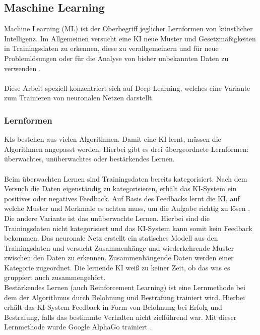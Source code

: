\documentclass[12pt,oneside,a4paper,parskip]{scrbook}
\begin{document}
\subsection{Maschine Learning}
Machine Learning (ML) ist der Oberbegriff jeglicher Lernformen von künstlicher Intelligenz. Im Allgemeinen versucht eine KI neue Muster und Gesetzmäßigkeiten in Trainingsdaten zu erkennen, diese zu verallgemeinern und für neue Problemlösungen oder für die Analyse von bisher unbekannten Daten zu verwenden \cite{EliminateHumanBias}.
\\\\Diese Arbeit speziell konzentriert sich auf Deep Learning, welches eine Variante zum Trainieren von neuronalen Netzen darstellt.
\subsubsection{Lernformen}
KIs bestehen aus vielen Algorithmen. Damit eine KI lernt, müssen die Algorithmen angepasst werden. Hierbei gibt es drei übergeordnete Lernformen: überwachtes, unüberwachtes oder bestärkendes Lernen. \\\\
Beim überwachten Lernen sind Trainingsdaten bereits kategorisiert. Nach dem Versuch die Daten eigenständig zu kategorisieren, erhält das KI-System ein positives oder negatives Feedback. Auf Basis des Feedbacks lernt die KI, auf welche Muster und Merkmale es achten muss, um die Aufgabe richtig zu lösen \cite{Grundlagen}. \\
Die andere Variante ist das unüberwachte Lernen. Hierbei sind die Trainingsdaten nicht kategorisiert und das KI-System kann somit kein Feedback bekommen. Das neuronale Netz erstellt ein statisches Modell aus den Trainingsdaten und versucht Zusammenhänge und wiederkehrende Muster zwischen den Daten zu erkennen. Zusammenhängende Daten werden einer Kategorie zugeordnet. Die lernende KI weiß zu keiner Zeit, ob das was es gruppiert auch zusammengehört.\\
Bestärkendes Lernen (auch Reinforcement Learning) ist eine Lernmethode bei dem der Algorithmus durch Belohnung und Bestrafung trainiert wird. Hierbei erhält das KI-System Feedback in Form von Belohnung bei Erfolg und Bestrafung, falls das bestimmte Verhalten nicht zielführend war. Mit dieser Lernmethode wurde Google AlphaGo trainiert \cite{Grundlagen}.
\end{document}
